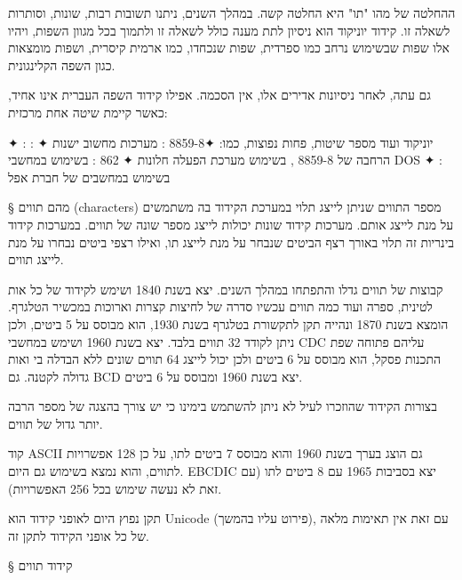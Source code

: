 ההחלטה של מהו "תו" היא החלטה קשה. במהלך השנים, ניתנו תשובות רבות, שונות, וסותרות לשאלה זו. קידוד יוניקוד הוא ניסיון לתת מענה כולל לשאלה זו ולתמוך בכל מגוון השפות, ויהיו אלו שפות שבשימוש נרחב כמו ספרדית, שפות שנכחדו, כמו ארמית קיסרית, ושפות מומצאות כגון השפה הקלינגונית.

גם עתה, לאחר ניסיונות אדירים אלו, אין הסכמה. אפילו קידוד השפה העברית אינו אחיד, כאשר קיימת שיטה אחת מרכזית:
\begin{itemize}
✦ : יוניקוד
ועוד מספר שיטות, פחות נפוצות, כמו:
✦8859-8 : מערכות מחשוב ישנות
✦ : הרחבה של 8859-8 , בשימוש מערכת הפעלה חלונות
✦ 862 : בשימוש במחשבי DOS
✦ : בשימוש במחשבים של חברת אפל
\end{itemize}

§ מהם תווים (characters)
מספר התווים שניתן לייצג תלוי במערכת הקידוד בה משתמשים על מנת לייצג אותם. מערכות קידוד שונות יכולות לייצג מספר שונה של תווים. במערכות קידוד בינריות זה תלוי באורך רצף הביטים שנבחר על מנת לייצג תו, ואילו רצפי ביטים נבחרו על מנת לייצג תווים.

קבוצות של תווים גדלו והתפתחו במהלך השנים.  יצא בשנת 1840 ושימש לקידוד של כל אות לטינית, ספרה ועוד כמה תווים עכשיו סדרה של לחיצות קצרות וארוכות במכשיר הטלגרף.  הומצא בשנת 1870 ונהייה תקן לתקשורת בטלגרף בשנת 1930, הוא מבוסס על 5 ביטים, ולכן ניתן לקודד 32 תווים בלבד.  יצא בשנת 1960 ושימש במחשבי CDC עליהם פתוחה שפת התכנות פסקל, הוא מבוסס על 6 ביטים ולכן יכול לייצג 64 תווים שונים ללא הבדלה בי ואות גדולה לקטנה. גם BCD יצא בשנת 1960 ומבוסס על 6 ביטים.

בצורות הקידוד שהוזכרו לעיל לא ניתן להשתמש בימינו כי יש צורך בהצגה של מספר הרבה יותר גדול של תווים.

קוד ASCII גם הוצג בערך בשנת 1960 והוא מבוסס 7 ביטים לתו, על כן 128 אפשרויות לתווים, והוא נמצא בשימוש גם היום. EBCDIC יצא בסביבות 1965 עם 8 ביטים לתו (עם זאת לא נעשה שימוש בכל 256 האפשרויות).

תקן נפוץ היום לאופני קידוד הוא Unicode (פירוט עליו בהמשך), עם זאת אין תאימות מלאה של כל אופני הקידוד לתקן זה.

§ קידוד תווים
